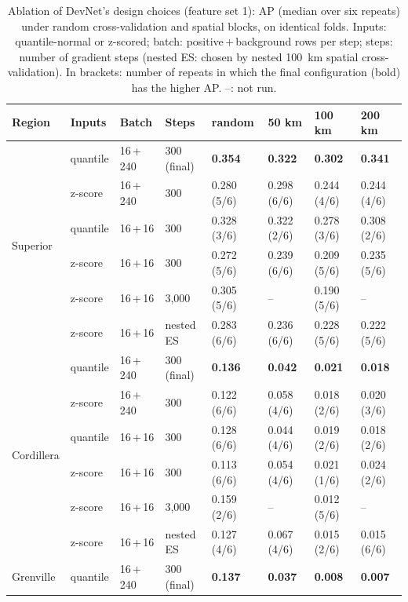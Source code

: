 \documentclass[pdflatex,sn-apa]{sn-jnl}
\begin{document}
\begin{appendices}
\begin{table}[!h]
\caption{Ablation of DevNet's design choices (feature set 1): AP (median over six repeats) under random cross-validation and spatial blocks, on identical folds. Inputs: quantile-normal or z-scored; batch: positive\,+\,background rows per step; steps: number of gradient steps (nested ES: chosen by nested 100~km spatial cross-validation). In brackets: number of repeats in which the final configuration (bold) has the higher AP. --: not run.}\label{tab:ablation}
\scriptsize
\setlength{\tabcolsep}{2.5pt}
\begin{tabular*}{\textwidth}{@{\extracolsep\fill}llllllll}
\toprule
Region & Inputs & Batch & Steps & random & 50 km & 100 km & 200 km \\
\midrule
\multirow{6}{*}{Superior} & quantile & 16\,+\,240 & 300 (final) & \textbf{0.354} & \textbf{0.322} & \textbf{0.302} & \textbf{0.341} \\
 & z-score & 16\,+\,240 & 300 & 0.280 (5/6) & 0.298 (6/6) & 0.244 (4/6) & 0.244 (4/6) \\
 & quantile & 16\,+\,16 & 300 & 0.328 (3/6) & 0.322 (2/6) & 0.278 (3/6) & 0.308 (2/6) \\
 & z-score & 16\,+\,16 & 300 & 0.272 (5/6) & 0.239 (6/6) & 0.209 (5/6) & 0.235 (5/6) \\
 & z-score & 16\,+\,16 & 3,000 & 0.305 (5/6) & -- & 0.190 (5/6) & -- \\
 & z-score & 16\,+\,16 & nested ES & 0.283 (6/6) & 0.236 (6/6) & 0.228 (5/6) & 0.222 (5/6) \\
\midrule
\multirow{6}{*}{Cordillera} & quantile & 16\,+\,240 & 300 (final) & \textbf{0.136} & \textbf{0.042} & \textbf{0.021} & \textbf{0.018} \\
 & z-score & 16\,+\,240 & 300 & 0.122 (6/6) & 0.058 (4/6) & 0.018 (2/6) & 0.020 (3/6) \\
 & quantile & 16\,+\,16 & 300 & 0.128 (6/6) & 0.044 (4/6) & 0.019 (2/6) & 0.018 (2/6) \\
 & z-score & 16\,+\,16 & 300 & 0.113 (6/6) & 0.054 (4/6) & 0.021 (1/6) & 0.024 (2/6) \\
 & z-score & 16\,+\,16 & 3,000 & 0.159 (2/6) & -- & 0.012 (5/6) & -- \\
 & z-score & 16\,+\,16 & nested ES & 0.127 (4/6) & 0.067 (4/6) & 0.015 (2/6) & 0.015 (6/6) \\
\midrule
\multirow{6}{*}{Grenville} & quantile & 16\,+\,240 & 300 (final) & \textbf{0.137} & \textbf{0.037} & \textbf{0.008} & \textbf{0.007} \\

\end{tabular*}
\end{table}
\end{appendices}
\end{document}
